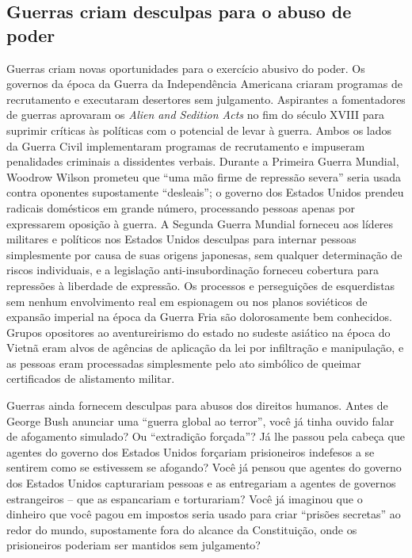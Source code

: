 \subsection*{Guerras criam desculpas para o abuso de poder}

Guerras criam novas oportunidades para o exercício abusivo do poder. Os governos da época da Guerra da Independência Americana criaram programas de recrutamento e executaram desertores sem julgamento. Aspirantes a fomentadores de guerras aprovaram os \emph{Alien and Sedition Acts} no fim do século XVIII para suprimir críticas às políticas com o potencial de levar à guerra. Ambos os lados da Guerra Civil implementaram programas de recrutamento e impuseram penalidades criminais a dissidentes verbais. Durante a Primeira Guerra Mundial, Woodrow Wilson prometeu que ``uma mão firme de repressão severa'' seria usada contra oponentes supostamente ``desleais''; o governo dos Estados Unidos prendeu radicais domésticos em grande número, processando pessoas apenas por expressarem oposição à guerra. A Segunda Guerra Mundial forneceu aos líderes militares e políticos nos Estados Unidos desculpas para internar pessoas simplesmente por causa de suas origens japonesas, sem qualquer determinação de riscos individuais, e a legislação anti-insubordinação forneceu cobertura para repressões à liberdade de expressão. Os processos e perseguições de esquerdistas sem nenhum envolvimento real em espionagem ou nos planos soviéticos de expansão imperial na época da Guerra Fria são dolorosamente bem conhecidos. Grupos opositores ao aventureirismo do estado no sudeste asiático na época do Vietnã eram alvos de agências de aplicação da lei por infiltração e manipulação, e as pessoas eram processadas simplesmente pelo ato simbólico de queimar certificados de alistamento militar.

Guerras ainda fornecem desculpas para abusos dos direitos humanos. Antes de George Bush anunciar uma ``guerra global ao terror'', você já tinha ouvido falar de afogamento simulado? Ou ``extradição forçada''? Já lhe passou pela cabeça que agentes do governo dos Estados Unidos forçariam prisioneiros indefesos a se sentirem como se estivessem se afogando? Você já pensou que agentes do governo dos Estados Unidos capturariam pessoas e as entregariam a agentes de governos estrangeiros -- que as espancariam e torturariam? Você já imaginou que o dinheiro que você pagou em impostos seria usado para criar ``prisões secretas'' ao redor do mundo, supostamente fora do alcance da Constituição, onde os prisioneiros poderiam ser mantidos sem julgamento?

